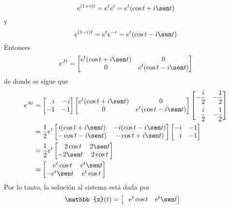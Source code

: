 \begin{example}
    $$e^{(1 + i)t} = e^t e^i = e^t(\cos t + i \sen t)$$
    y
    $$e^{(1 - i)t} = e^t e^{-i} = e^t(\cos t - i \sen t)$$
    Entonces
    $$e^{Jt} = \begin{bmatrix}
        e^t(\cos t + i \sen t) & 0 \\
        0 & e^t(\cos t - i \sen t)
    \end{bmatrix}$$
    de donde se sigue que
    \begin{align*}
        e^{At} & = \begin{bmatrix*}[r]
            i & -i \\
            -1 & -1
        \end{bmatrix*} \begin{bmatrix}
            e^t(\cos t + i \sen t) & 0 \\
            0 & e^t(\cos t - i \sen t)
        \end{bmatrix} \begin{bmatrix*}[r]
            -\dfrac{i}{2} & -\dfrac{1}{2} \\[3mm]
            \dfrac{i}{2} & -\dfrac{1}{2}
        \end{bmatrix*} \\
        & = \frac{1}{2} e^t \begin{bmatrix}
            i( \cos t + i\sen t) & -i(\cos t - i\sen t) \\
            -\cos t - i\sen t) & -\cos t + i\sen t)
        \end{bmatrix} \begin{bmatrix*}[r]
            -i & -1 \\
            i & -1
        \end{bmatrix*} \\
        & = \frac{1}{2} e^t \begin{bmatrix}
            \phantom{-} 2\cos t & 2\sen t \\
            - 2\sen t & 2\cos t
        \end{bmatrix} \\
        & = \begin{bmatrix}
            \phantom{-} e^t \cos t & e^t \sen t \\
            - e^t \sen t & e^t \cos t
        \end{bmatrix}
    \end{align*}
    Por lo tanto, la solución al sistema está dada por
    \begin{align*}
        \mathbb{x}(t) & = \begin{bmatrix}
            \phantom{-} e^t \cos t & e^t \sen t \\

\end{bmatrix}
\end{align*}
\end{example}

